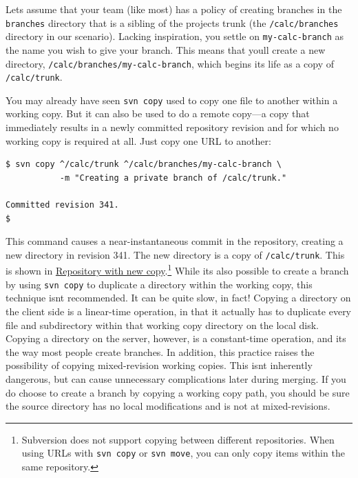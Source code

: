 Let\textquotesingle s assume that your team (like most) has a policy of
creating branches in the \texttt{branches} directory that is a sibling
of the project\textquotesingle s trunk (the \texttt{/calc/branches}
directory in our scenario). Lacking inspiration, you settle on
\texttt{my-calc-branch} as the name you wish to give your branch. This
means that you\textquotesingle ll create a new directory,
\texttt{/calc/branches/my-calc-branch}, which begins its life as a copy
of \texttt{/calc/trunk}.

You may already have seen \texttt{svn\ copy} used to copy one file to
another within a working copy. But it can also be used to do a remote
copy---a copy that immediately results in a newly committed repository
revision and for which no working copy is required at all. Just copy one
URL to another:

\begin{verbatim}
$ svn copy ^/calc/trunk ^/calc/branches/my-calc-branch \
           -m "Creating a private branch of /calc/trunk."

Committed revision 341.
$
\end{verbatim}

This command causes a near-instantaneous commit in the repository,
creating a new directory in revision 341. The new directory is a copy of
\texttt{/calc/trunk}. This is shown in
\hyperref[svn.branchmerge.using.create.dia-1]{Repository with new
copy}.\footnote{Subversion does not support copying between different
  repositories. When using URLs with \texttt{svn\ copy} or
  \texttt{svn\ move}, you can only copy items within the same
  repository.} While it\textquotesingle s also possible to create a
branch by using \texttt{svn\ copy} to duplicate a directory within the
working copy, this technique isn\textquotesingle t recommended. It can
be quite slow, in fact! Copying a directory on the client side is a
linear-time operation, in that it actually has to duplicate every file
and subdirectory within that working copy directory on the local disk.
Copying a directory on the server, however, is a constant-time
operation, and it\textquotesingle s the way most people create branches.
In addition, this practice raises the possibility of copying
mixed-revision working copies. This isn\textquotesingle t inherently
dangerous, but can cause unnecessary complications later during merging.
If you do choose to create a branch by copying a working copy path, you
should be sure the source directory has no local modifications and is
not at mixed-revisions.

